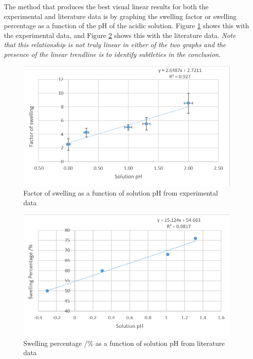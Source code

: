 \documentclass[11pt, letterpaper]{article}
\begin{document}
The method that produces the best visual linear results for both the experimental and literature data is by graphing
the swelling factor or swelling percentage as a function of
the pH of the acidic solution. Figure \ref*{fig:experimentalPH} shows this with the experimental
data, and Figure \ref*{fig:literaturePH} shows this with the literature data.
\textit{Note that this relationship is not truly linear in either of the
    two graphs and the presence of the linear trendline is to identify subtleties
    in the conclusion}.

\begin{paracol}{2}
    \begin{figure}[H]
        \centering
        \includegraphics[width=\linewidth]{experimentalPH.png}
        \caption{Factor of swelling as a function of solution pH from experimental data}
        \label{fig:experimentalPH}
    \end{figure}
    \switchcolumn
    \begin{figure}[H]
        \centering
        \includegraphics[width=\linewidth]{literaturePH.png}
        \caption{Swelling percentage /\% as a function of solution pH from literature data \protect\cite{ramavaraprasadSwellingCharacteristicsSoils2018a}}
        \label{fig:literaturePH}
    \end{figure}
\end{paracol}
\end{document}
